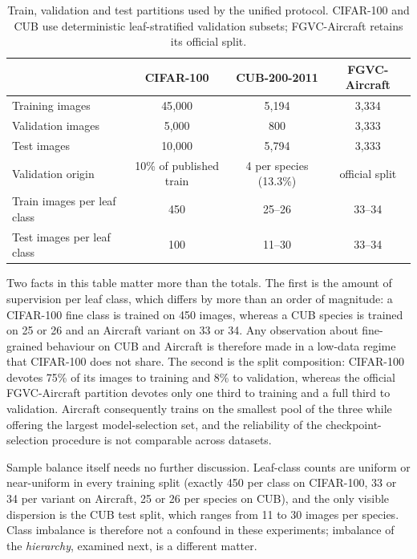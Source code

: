 \begin{table}[ht]
\centering
\caption{Train, validation and test partitions used by the unified protocol.
CIFAR-100 and CUB use deterministic leaf-stratified validation subsets;
FGVC-Aircraft retains its official split.}
\label{tab:protocol_splits}
\fontsize{8}{11}\selectfont
\begin{tabular}{lccc}
\toprule
\textbf{} & \textbf{CIFAR-100} & \textbf{CUB-200-2011} & \textbf{FGVC-Aircraft} \\
\midrule
Training images             & 45{,}000      & 5{,}194           & 3{,}334 \\
Validation images           & 5{,}000       & 800               & 3{,}333 \\
Test images                 & 10{,}000      & 5{,}794           & 3{,}333 \\
Validation origin           & 10\% of published train & 4 per species (13.3\%) & official split \\
\midrule
Train images per leaf class & 450           & 25--26            & 33--34 \\
Test images per leaf class  & 100           & 11--30            & 33--34 \\
\bottomrule
\end{tabular}
\end{table}

Two facts in this table matter more than the totals. The first is the amount of supervision per leaf class, which differs by more than an order of magnitude: a CIFAR-100 fine class is trained on 450 images, whereas a CUB species is trained on 25 or 26 and an Aircraft variant on 33 or 34. Any observation about fine-grained behaviour on CUB and Aircraft is therefore made in a low-data regime that CIFAR-100 does not share. The second is the split composition: CIFAR-100 devotes 75\% of its images to training and 8\% to validation, whereas the official FGVC-Aircraft partition devotes only one third to training and a full third to validation. Aircraft consequently trains on the smallest pool of the three while offering the largest model-selection set, and the reliability of the checkpoint-selection procedure is not comparable across datasets.

Sample balance itself needs no further discussion. Leaf-class counts are uniform or near-uniform in every training split (exactly 450 per class on CIFAR-100, 33 or 34 per variant on Aircraft, 25 or 26 per species on CUB), and the only visible dispersion is the CUB test split, which ranges from 11 to 30 images per species. Class imbalance is therefore not a confound in these experiments; imbalance of the \emph{hierarchy}, examined next, is a different matter.


